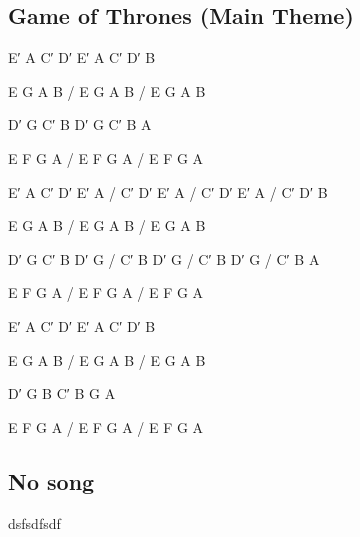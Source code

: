 \documentclass{memoir}
\newenvironment{song}[1]
{ 
\subsection{#1}   
\noindent \huge \ttfamily \par
}
{  \clearpage
}
\begin{document}
\begin{song}{ Game of Thrones (Main Theme)}
E′ A C′ D′ E′ A C′ D′ B

E G A B / E G A B / E G A B

D′ G C′ B D′ G C′ B A

E F G A / E F G A / E F G A

E′ A C′ D′ E′ A / C′ D′ E′ A / C′ D′ E′ A / C′ D′ B

E G A B / E G A B / E G A B

D′ G C′ B D′ G / C′ B D′ G / C′ B D′ G / C′ B A

E F G A / E F G A / E F G A

E′ A C′ D′ E′ A C′ D′ B

E G A B / E G A B / E G A B

D′ G B C′ B G A

E F G A / E F G A / E F G A
\end{song}
\begin{song}{No song}
dsfsdfsdf
\end{song}
\end{document}
